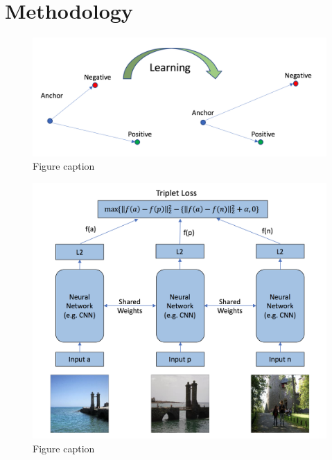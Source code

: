\documentclass[final,3p]{elsarticle}
\begin{document}
\section{Methodology}
\label{S:2}

\begin{figure}[hbtp]
\centering\includegraphics[width=1.0\linewidth]{./figures/learning.png}
\caption{Figure caption}
\label{fig:problem}
\end{figure}


\begin{figure}[hbtp]
\centering\includegraphics[width=1.0\linewidth]{./figures/triplet.png}
\caption{Figure caption}
\label{fig:problem}
\end{figure}
\end{document}
